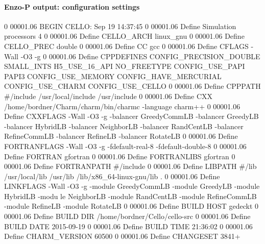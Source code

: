 \begin{frame}[fragile]
\secframetitle{\ssRunning}
\framesubtitle{Enzo-P output: configuration settings}
\tiny
\begin{semiverbatim}
0 00001.06  BEGIN CELLO: Sep 19 14:37:45
0 00001.06 Define Simulation processors 4
0 00001.06 Define CELLO_ARCH linux_gnu
0 00001.06 Define CELLO_PREC double
0 00001.06 Define CC            gcc 
0 00001.06 Define CFLAGS        -Wall -O3 -g   
0 00001.06 Define CPPDEFINES    CONFIG_PRECISION_DOUBLE SMALL_INTS H5_USE_16_API NO_FREETYPE CONFIG_USE_PAPI 
PAPI3 CONFIG_USE_MEMORY CONFIG_HAVE_MERCURIAL CONFIG_USE_CHARM CONFIG_USE_CELLO
0 00001.06 Define CPPPATH       #/include /usr/local/include /usr/include
0 00001.06 Define CXX           /home/bordner/Charm/charm/bin/charmc -language charm++  
0 00001.06 Define CXXFLAGS      -Wall -O3 -g     -balancer GreedyCommLB -balancer GreedyLB -balancer HybridLB
 -balancer NeighborLB -balancer RandCentLB -balancer RefineCommLB -balancer RefineLB -balancer RotateLB
0 00001.06 Define FORTRANFLAGS  -Wall -O3 -g    -fdefault-real-8 -fdefault-double-8
0 00001.06 Define FORTRAN       gfortran
0 00001.06 Define FORTRANLIBS   gfortran
0 00001.06 Define FORTRANPATH   #/include
0 00001.06 Define LIBPATH       #/lib /usr/local/lib /usr/lib /lib/x86_64-linux-gnu/lib .
0 00001.06 Define LINKFLAGS     -Wall -O3 -g     -module GreedyCommLB -module GreedyLB -module HybridLB -modu
le NeighborLB -module RandCentLB -module RefineCommLB -module RefineLB -module RotateLB
0 00001.06 Define BUILD HOST    gedeckt
0 00001.06 Define BUILD DIR     /home/bordner/Cello/cello-src
0 00001.06 Define BUILD DATE    2015-09-19
0 00001.06 Define BUILD TIME    21:36:02
0 00001.06 Define CHARM_VERSION 60500
0 00001.06 Define CHANGESET     3841+
\end{semiverbatim}
\end{frame}
